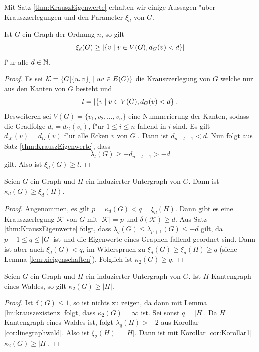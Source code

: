 Mit Satz \ref{thm:KrauszEigenwerte} erhalten wir einige Aussagen "uber Krauszzerlegungen und den Parameter $\xi_{d}$ von $G$.

\begin{corollary}
  Ist $G$ ein Graph der Ordnung $n$, so gilt $$\xi_{d}(G) \geq | \{v \;|\; v\in V(G), d_{G}(v) < d \}|$$
  f"ur alle $d\in {\mathbb{N}}$. 
  \label{cor:xiorderschranke}
\end{corollary}
\begin{proof}
  Es sei $\mathcal{K}= \{G[\{u,v\}] \;|\; uv\in E(G) \}$ die Krauszzerlegung von $G$ welche nur aus den Kanten von $G$ besteht und $$l = |\{v \;|\; v\in V(G), d_{G}(v) < d \}|.$$ 
  Desweiteren sei $V(G) = \{ v_1,v_2,\dots , v_n\}$ eine Nummerierung der Kanten, sodass die Gradfolge $d_i = d_{G}(v_i)$, f"ur $1\leq i \leq n$ fallend in $i$ sind. 
  Es gilt $d_{\mathcal{K}}(v) = d_{G}(v)$ f"ur alle Ecken $v$ von $G$ . Dann ist $d_{n-l+1} < d$. Nun folgt aus Satz \ref{thm:KrauszEigenwerte}, dass
  $$\lambda_{l}(G) \geq - d_{n-l+1} > -d$$
  gilt. Also ist $\xi_{d}(G) \geq l$. 
\end{proof}

\begin{corollary}
  \label{cor:Korollar1}
  Seien $G$ ein Graph und $H$ ein induzierter Untergraph von $G$. Dann ist $\kappa_{d}(G) \geq \xi_{d}(H)$.
\end{corollary}

\begin{proof}
  Angenommen, es gilt $p = \kappa_{d}(G) < q=\xi_d(H)$. Dann gibt es  eine Krauszzerlegung $\mathcal{K}$ von $G$ mit $|\mathcal{K}| = p$ und $\delta(\mathcal{K}) \geq d$. 
  Aus Satz \ref{thm:KrauszEigenwerte} folgt, dass $\lambda_{q}(G) \leq \lambda_{p+1}(G) \leq -d $ gilt, da $p+1 \leq q \leq |G|$ ist und die Eigenwerte eines Graphen fallend geordnet sind. 
  Dann ist aber auch $\xi_{d}(G) < q$, im Widerspruch zu $\xi_{d}(G) \geq \xi_{d}(H) \geq  q$ (siehe Lemma \ref{lem:xieigenschaften}). Folglich ist $\kappa_2(G) \geq q$.
\end{proof}

\begin{corollary}
  \label{cor:LineGraphWald}
  Seien $G$ ein Graph und $H$ ein induzierter Untergraph von $G$. Ist $H$ Kantengraph eines Waldes, so gilt 
  $\kappa_{2}(G)\geq \left|H\right|$.
\end{corollary}

\begin{proof}
  Ist $\delta(G) \leq 1$, so ist nichts zu zeigen, da dann mit Lemma \ref{lm:krauszexistenz} folgt, dass $\kappa_2(G) = \infty$ ist.
  Sei sonst $q = |H|$. Da $H$ Kantengraph eines Waldes ist, folgt $\lambda_{q}(H) > -2$ aus Korollar \ref{cor:linegraphwald}. Also ist $\xi_{2}(H) = |H|$.
  Dann ist mit Korollar \ref{cor:Korollar1} $\kappa_{2}\left( G \right) \geq \left| H\right|$.
\end{proof}

